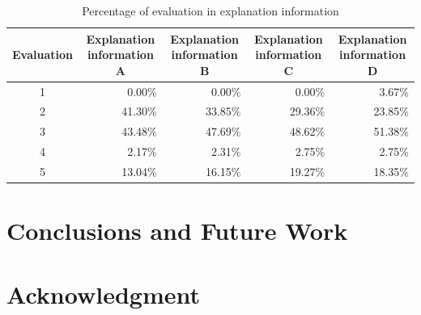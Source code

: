 \documentclass[journal]{IAENGtran}
\begin{document}
\begin{table}[t]
  \caption{Percentage of evaluation in explanation information}
  \label{table:Percentage of evaluation in explanation information}
  \centering
  \begin{tabular}{c|r|r|r|r}
  \hline
  Evaluation & \multicolumn{1}{c|}{Explanation information A} & \multicolumn{1}{c|}{Explanation information B} & \multicolumn{1}{c|}{Explanation information C} & \multicolumn{1}{c}{Explanation information D} \\ \hline
  1  & 0.00\%                     & 0.00\%                     & 0.00\%                     & 3.67\%                    \\
  2  & 41.30\%                    & 33.85\%                    & 29.36\%                    & 23.85\%                   \\
  3  & 43.48\%                    & 47.69\%                    & 48.62\%                    & 51.38\%                   \\
  4  & 2.17\%                     & 2.31\%                     & 2.75\%                     & 2.75\%                    \\
  5  & 13.04\%                    & 16.15\%                    & 19.27\%                    & 18.35\%                   \\ \hline
  \end{tabular}
\end{table}



\section{Conclusions and Future Work}
\label{sec:Conclusions and Future Work}







\section*{Acknowledgment}
\end{document}
